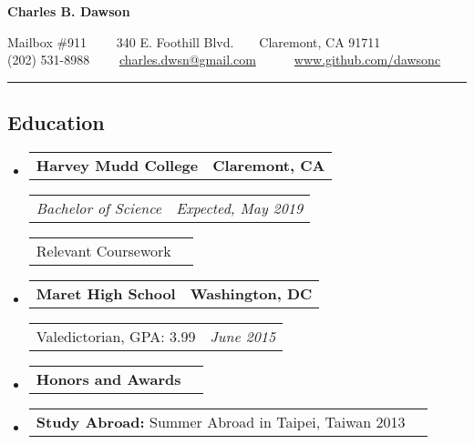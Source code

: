 \documentclass[10pt,letterpaper]{article}
\makeatletter
\newcommand{\headerrow}[2]
{\begin{tabular*}{\linewidth}{l@{\extracolsep{\fill}}r}
	#1 &
	#2 \\
\end{tabular*}}
\makeatother
\begin{document}
\begin{center}
{\Large \textbf{Charles B. Dawson}}

Mailbox \#911 \ \ \textbullet \ \ 340 E. Foothill Blvd.\ \ \textbullet \ \ Claremont, CA 91711
\\
(202) 531-8988\ \ \textbullet
\ \ \href{mailto:charles.dwsn@gmail.com}{charles.dwsn@gmail.com} \ \ \textbullet
\ \ \urlstyle{\familydefault} \url{www.github.com/dawsonc}
\end{center}

\hrule
\vspace{-0.2em}

\subsection*{Education}

\begin{itemize}
	\parskip=0.1em

	\item 
	\headerrow
		{\textbf{Harvey Mudd College}}
		{\textbf{Claremont, CA}}
	
	\headerrow
		{\emph{Bachelor of Science}}
		{\emph{Expected, May 2019}}
	\headerrow
		{Relevant Coursework}{}	
	
	\item 
	\headerrow
		{\textbf{Maret High School}}
		{\textbf{Washington, DC}}
	
	\headerrow
		{Valedictorian, GPA: 3.99}
		{\emph{June 2015}}	
	
	\item
	\headerrow
		{\textbf{Honors and Awards}}{}
	
	\item
	\headerrow
		{\textbf{Study Abroad:} Summer Abroad in Taipei, Taiwan 2013}
		{}

\end{itemize}
\end{document}
